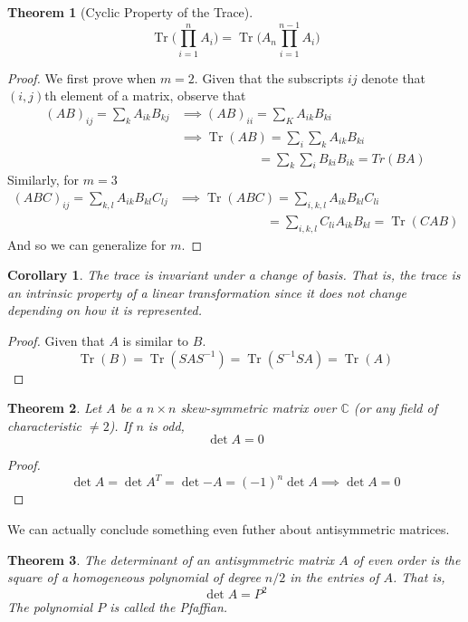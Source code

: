 \documentclass{article}
\DeclareMathOperator{\Tr}{Tr}
\newtheorem{theorem}{Theorem}[section]
\newtheorem{corollary}{Corollary}[theorem]
\theoremstyle{remark}
\theoremstyle{definition}
\begin{document}
  \begin{theorem}[Cyclic Property of the Trace]
  \[\Tr{\bigg(\prod_{i=1}^n A_i\bigg)} = \Tr{\bigg(A_n \prod_{i=1}^{n-1} A_i\bigg)}\]
  \end{theorem}
  \begin{proof}
  We first prove when $m=2$. Given that the subscripts $i j$ denote that $(i,j)$th element of a matrix, observe that
  \begin{align*}
      (AB)_{ij} = \sum_{k} A_{ik} B_{kj} & \implies (AB)_{ii} = \sum_{K} A_{ik} B_{ki} \\
      & \implies \Tr(AB) = \sum_{i} \sum_{k} A_{ik} B_{ki} \\
      & \;\;\;\;\;\;\;\;\;\;\;\;\;\;\;\;\;\;\;\;\;\;= \sum_{k} \sum_{i} B_{ki} B_{ik} = Tr(BA)
  \end{align*}
  Similarly, for $m=3$
  \begin{align*}
      (ABC)_{ij} = \sum_{k,l} A_{ik} B_{kl} C_{lj} & \implies \Tr(ABC) = \sum_{i,k,l} A_{ik} B_{kl} C_{li} \\ 
      & \;\;\;\;\;\;\;\;\;\;\;\;\;\;\;\;\;\;\;\;\;\;\;\;\;= \sum_{i,k,l} C_{li} A_{ik} B_{kl} = \Tr(CAB)
  \end{align*}
  And so we can generalize for $m$. 
  \end{proof}

  \begin{corollary}
  The trace is invariant under a change of basis. That is, the trace is an intrinsic property of a linear transformation since it does not change depending on how it is represented. 
  \end{corollary}
  \begin{proof}
  Given that $A$ is similar to $B$. 
  \[\Tr(B) = \Tr(S A S^{-1}) = \Tr(S^{-1} S A) = \Tr(A) \]
  \end{proof}

  \begin{theorem}
  Let $A$ be a $n \times n$ skew-symmetric matrix over $\mathbb{C}$ (or any field of characteristic $\neq 2$). If $n$ is odd, 
  \[\det{A} = 0 \]
  \end{theorem}
  \begin{proof}
  \[\det{A} = \det{A^T} = \det{-A} = (-1)^n \det{A} \implies \det{A} = 0 \]
  \end{proof}

  We can actually conclude something even futher about antisymmetric matrices. 

  \begin{theorem}
  The determinant of an antisymmetric matrix $A$ of even order is the square of a homogeneous polynomial of degree $n/2$ in the entries of $A$. That is, 
  \[\det{A} = P^2\]
  The polynomial $P$ is called the \textit{Pfaffian}. 
  \end{theorem}
\end{document}
